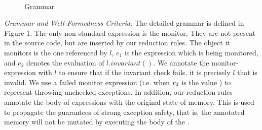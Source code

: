 \begin{figure}
\begin{grammatica}
\\
\\
\\
\\
\\
\\
\end{grammatica}
\caption{Grammar}
\end{figure}


\loseSpace
\noindent\textit{Grammar and Well-Formedness Criteria:}
The detailed grammar is defined in Figure 1.
The only non-standard expression is the monitor. They are not present in the source code, but are inserted by our reduction rules. The object it monitors is the one referenced by $l$, $e_1$ is the expression which is being monitored, and $e_2$ denotes the evaluation of $l.invariant()$.
We annotate the monitor-expression with $l$ to ensure
that if the invariant check fails, it is precisely $l$ that is invalid.
We use a failed monitor expression (i.e. when ${\mathit{e}}_2$ is the value \Q@false@) to represent throwing unchecked exceptions.
In addition, our reduction rules annotate the body of \Q@try@ expressions with
the original state of memory. This is used to propagate the guarantees of strong exception safety,
that is, the annotated memory will not be mutated by executing the body of the \Q@try@.

